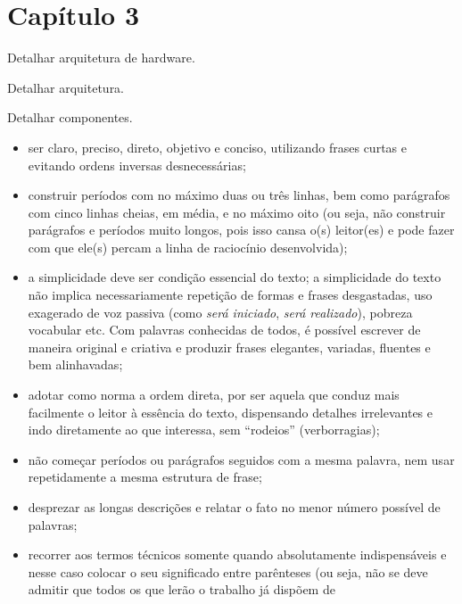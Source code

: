 \chapter{Capítulo 3}

\begin{guide}
Detalhar arquitetura de hardware.
\end{guide}

\begin{guide}
Detalhar arquitetura.
\end{guide}

\begin{guide}
Detalhar componentes.
\end{guide}


\begin{itemize}
   \item ser claro, preciso, direto, objetivo e conciso, utilizando frases
   curtas e evitando ordens inversas desnecessárias;
   \item construir períodos com no máximo duas ou três linhas, bem como
   parágrafos com cinco linhas cheias, em média, e no máximo oito (ou seja, não
   construir parágrafos e períodos muito longos, pois isso cansa o(s) leitor(es)
   e pode fazer com que ele(s) percam a linha de raciocínio desenvolvida);
   \item a simplicidade deve ser condição essencial do texto; a simplicidade do
   texto não implica necessariamente repetição de formas e frases desgastadas,
   uso exagerado de voz passiva (como \textit{será iniciado}, \textit{será
   realizado}), pobreza vocabular etc. Com palavras conhecidas de todos, é
   possível escrever de maneira original e criativa e produzir frases elegantes,
   variadas, fluentes e bem alinhavadas;
   \item adotar como norma a ordem direta, por ser aquela que conduz mais
   facilmente o leitor à essência do texto, dispensando detalhes irrelevantes e
   indo diretamente ao que interessa, sem ``rodeios'' (verborragias);
   \item não começar períodos ou parágrafos seguidos com a mesma palavra, nem
   usar repetidamente a mesma estrutura de frase;
   \item desprezar as longas descrições e relatar o fato no menor número
   possível de palavras;
   \item recorrer aos termos técnicos somente quando absolutamente
   indispensáveis e nesse caso colocar o seu significado entre parênteses (ou
   seja, não se deve admitir que todos os que lerão o trabalho já dispõem de

\end{itemize}
